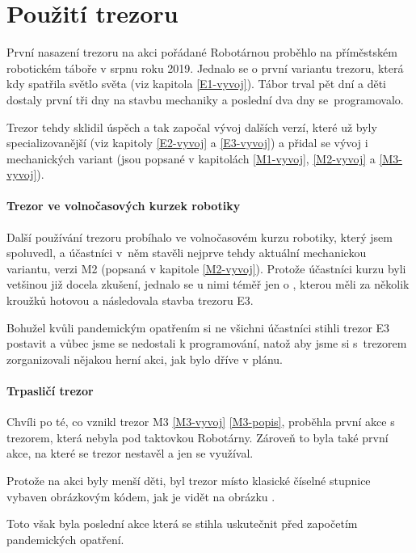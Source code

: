 
\section{Použití trezoru}
První nasazení trezoru na akci pořádané Robotárnou \parencite{robotarna} proběhlo na příměstském robotickém táboře v srpnu roku 2019.
Jednalo se o první variantu trezoru, která kdy spatřila světlo světa (viz kapitola \ref{E1-vyvoj}). Tábor trval pět dní a děti dostaly první tři dny na stavbu mechaniky a poslední dva dny 
se~programovalo. 

Trezor tehdy sklidil úspěch a tak započal vývoj dalších verzí, které už byly specializovanější (viz kapitoly \ref{E2-vyvoj} a  \ref{E3-vyvoj}) a přidal se vývoj i mechanických
variant (jsou popsané v kapitolách \ref{M1-vyvoj}, \ref{M2-vyvoj} a \ref{M3-vyvoj}).

\paragraph{Trezor ve volnočasových kurzek robotiky}
Další používání trezoru pro\-bí\-ha\-lo ve volnočasovém kurzu robotiky, který jsem spoluvedl, a účastníci v~něm stavěli nejprve tehdy aktuální mechanickou variantu, verzi M2 (popsaná v kapitole \ref{M2-vyvoj}).
Protože účastníci kurzu byli vetšinou již docela zkušení, jednalo se u nimi téměř jen o , kterou měli za několik kroužků hotovou a následovala stavba trezoru E3. 

Bohužel kvůli pandemickým opatřením si ne všichni účastníci stihli trezor E3 postavit a vůbec jsme se nedostali k programování, natož aby jsme si s~trezorem zorganizovali nějakou herní akci, 
jak bylo dříve v plánu.

\paragraph{Trpasličí trezor}
Chvíli po té, co vznikl trezor M3 \ref{M3-vyvoj} \ref{M3-popis},  proběhla první akce s trezorem, která nebyla pod taktovkou Robotárny. Zároveň to byla také 
první akce, na které se trezor nestavěl a jen se využíval.

Protože na akci byly menší děti, byl trezor místo klasické číselné stupnice  vybaven obrázkovým kódem, jak je vidět na obrázku . %

Toto však byla poslední akce která se stihla uskutečnit před započetím pandemických opatření.

